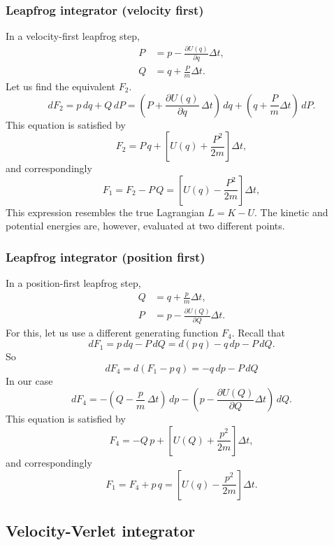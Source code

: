 \documentclass[aip,jcp,preprint,notitlepage, superscriptaddress]{revtex4-1}
\begin{document}
\subsubsection{Leapfrog integrator (velocity first)}


In a velocity-first leapfrog step,
%
\begin{equation}
\begin{aligned}
P &= p - \frac{ \partial U(q) } { \partial q } \Delta t, \\
Q &= q + \frac{P}{m} \Delta t.
\end{aligned}
\end{equation}
%
Let us find the equivalent $F_2$.
%
$$
dF_2 = p \, dq + Q \, dP
= \left( P + \frac{\partial U(q) }{ \partial q} \, \Delta t\right) \, dq
 + \left( q + \frac{ P }{m} \Delta t \right) \, dP.
$$
This equation is satisfied by
$$
F_2 = P \, q + \left[ U(q) + \frac{P^2}{2m} \right] \Delta t,
$$
and correspondingly
$$
F_1 = F_2 - P\, Q = \left[ U(q) - \frac{P^2}{2m} \right] \Delta t,
$$
This expression resembles the true Lagrangian $L = K - U$.
The kinetic and potential energies are, however, evaluated at two different points.




\subsubsection{Leapfrog integrator (position first)}


In a position-first leapfrog step,
%
\begin{equation}
\begin{aligned}
Q &= q + \frac{p}{m} \Delta t, \\
P &= p - \frac{ \partial U(Q) } { \partial Q } \Delta t.
\end{aligned}
\end{equation}
%
For this, let us use a different generating function $F_4$.
Recall that
$$
dF_1 =  p \, dq - P \, dQ = d (p \, q) - q \, dp - P \, dQ.
$$
So
$$
dF_4 = d(F_1 - p \, q) = -q \, dp - P \, dQ
$$
%
In our case
$$
dF_4
=
 - \left( Q - \frac{ p }{ m } \, \Delta t\right) \, dp
 - \left( p - \frac{ \partial U(Q) } { \partial Q } \Delta t \right) \, dQ.
$$
This equation is satisfied by
$$
F_4 = -Q \, p + \left[ U(Q) + \frac{p^2}{2m} \right] \Delta t,
$$
and correspondingly
$$
F_1 = F_4 + p \, q = \left[ U(q) - \frac{p^2}{2m} \right] \Delta t.
$$


\subsection{Velocity-Verlet integrator}
\end{document}
